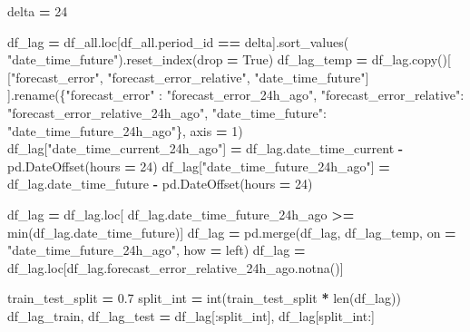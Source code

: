\documentclass[mstat,12pt]{unswthesis}
\newenvironment{Shaded}{\begin{snugshade}}{\end{snugshade}}
\newcommand{\BuiltInTok}[1]{#1}
\newcommand{\DecValTok}[1]{\textcolor[rgb]{0.00,0.00,0.81}{#1}}
\newcommand{\FloatTok}[1]{\textcolor[rgb]{0.00,0.00,0.81}{#1}}
\newcommand{\NormalTok}[1]{#1}
\newcommand{\OperatorTok}[1]{\textcolor[rgb]{0.81,0.36,0.00}{\textbf{#1}}}
\newcommand{\StringTok}[1]{\textcolor[rgb]{0.31,0.60,0.02}{#1}}
\newcommand{\VariableTok}[1]{\textcolor[rgb]{0.00,0.00,0.00}{#1}}
\begin{document}
\begin{Shaded}
\begin{Highlighting}[]
\NormalTok{delta }\OperatorTok{=} \DecValTok{24}

\NormalTok{df\_lag }\OperatorTok{=}\NormalTok{ df\_all.loc[df\_all.period\_id }\OperatorTok{==}\NormalTok{ delta].sort\_values(}
    \StringTok{"date\_time\_future"}\NormalTok{).reset\_index(drop }\OperatorTok{=} \VariableTok{True}\NormalTok{)}
\NormalTok{df\_lag\_temp }\OperatorTok{=} 
\NormalTok{df\_lag.copy()[}
\NormalTok{  [}\StringTok{"forecast\_error"}\NormalTok{, }\StringTok{"forecast\_error\_relative"}\NormalTok{, }\StringTok{"date\_time\_future"}\NormalTok{]}
\NormalTok{  ].rename(\{}\StringTok{"forecast\_error"}\NormalTok{ : }\StringTok{"forecast\_error\_24h\_ago"}\NormalTok{, }
            \StringTok{"forecast\_error\_relative"}\NormalTok{: }\StringTok{"forecast\_error\_relative\_24h\_ago"}\NormalTok{,}
            \StringTok{"date\_time\_future"}\NormalTok{: }\StringTok{"date\_time\_future\_24h\_ago"}\NormalTok{\}, axis }\OperatorTok{=} \DecValTok{1}\NormalTok{)}
\NormalTok{df\_lag[}\StringTok{"date\_time\_current\_24h\_ago"}\NormalTok{] }\OperatorTok{=} 
\NormalTok{    df\_lag.date\_time\_current }\OperatorTok{{-}}\NormalTok{ pd.DateOffset(hours }\OperatorTok{=} \DecValTok{24}\NormalTok{)}
\NormalTok{df\_lag[}\StringTok{"date\_time\_future\_24h\_ago"}\NormalTok{] }\OperatorTok{=} 
\NormalTok{    df\_lag.date\_time\_future }\OperatorTok{{-}}\NormalTok{ pd.DateOffset(hours }\OperatorTok{=} \DecValTok{24}\NormalTok{)}

\NormalTok{df\_lag }\OperatorTok{=}\NormalTok{ df\_lag.loc[}
\NormalTok{      df\_lag.date\_time\_future\_24h\_ago }\OperatorTok{\textgreater{}=} \BuiltInTok{min}\NormalTok{(df\_lag.date\_time\_future)]}
\NormalTok{df\_lag }\OperatorTok{=}\NormalTok{ pd.merge(df\_lag, df\_lag\_temp, }
\NormalTok{    on }\OperatorTok{=} \StringTok{"date\_time\_future\_24h\_ago"}\NormalTok{, how }\OperatorTok{=} \StringTok{\textquotesingle{}left\textquotesingle{}}\NormalTok{)}
\NormalTok{df\_lag }\OperatorTok{=}\NormalTok{ df\_lag.loc[df\_lag.forecast\_error\_relative\_24h\_ago.notna()]}

\NormalTok{train\_test\_split }\OperatorTok{=} \FloatTok{0.7}
\NormalTok{split\_int }\OperatorTok{=} \BuiltInTok{int}\NormalTok{(train\_test\_split }\OperatorTok{*} \BuiltInTok{len}\NormalTok{(df\_lag))}
\NormalTok{df\_lag\_train, df\_lag\_test }\OperatorTok{=}\NormalTok{ df\_lag[:split\_int], df\_lag[split\_int:]}
\end{Highlighting}
\end{Shaded}
\end{document}
